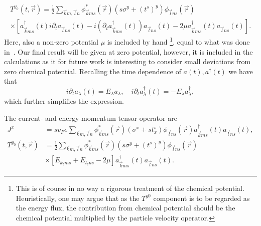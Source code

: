 \begin{multline}
    T^{y_0}(t, \vec{r}) =
    \frac{1}{2}
    \sum\limits_{\vec{k} m, \vec{l} n}^{}
    \phi ^{*}_{\vec{k} m s}(\vec{r}) (s \sigma^y + (t^s)^y) \phi _{\vec{l} n s }(\vec{r})\\
    \times \left[
      a^{\dagger}_{\vec{k} m s}(t) i \partial_t  a_{\vec{l} n s}(t)
      -
      i \left(\partial_t a^{\dagger}_{\vec{k} ms }(t) \right) a_{\vec{l} n s}(t)
      -  2\mu  a^{\dagger}_{\vec{k} m s}(t) a_{\vec{l} n s}(t)
        \right].
\end{multline}
Here, also a non-zero potential $\mu $ is included by hand%
\footnote{This is of course in no way a rigorous treatment of the chemical potential. Heuristically, one may argue that as the \( T^{y0} \) component is to be regarded as the energy flux, the contribution from chemical potential should be the chemical potential multiplied by the particle velocity operator. },%
equal to what was done in~\textcite{arjonaFingerprintsConformalAnomaly2019}.
Our final result will be given at zero potential, however, it is included in the calculations as it for future work is interesting to consider small deviations from zero chemical potential.
Recalling the time dependence of $a(t), a^{\dagger}(t)$ we have that
\[
  i \partial_t a_{\lambda }(t) = E_{\lambda }a_{\lambda },
  \quad
  i \partial_t a^{\dagger}_{\lambda }(t) = -E_{\lambda }a^{\dagger}_{\lambda },
\]
which further simplifies the expression.

\begin{summary}
  The current- and energy-momentum tensor operator are
  \begin{align}
    J^x &= sv_F e \sum\limits_{\vec{k}m, \vec{l}n}^{}
          \phi _{\vec{k}ms}^{*}(\vec{r}) \left(\sigma^x + s t^s_x\right) \phi _{\vec{l}ns}(\vec{r})
          a_{\vec{k}ms}^{\dagger}(t)
          a_{\vec{l}ns}(t),\\
    T^{y_0}(t, \vec{r}) &=
                          \frac{1}{2}
                          \sum\limits_{\vec{k} m, \vec{l} n}^{}
                          \phi ^{*}_{\vec{k} m s}(\vec{r}) (s \sigma^y + (t^s)^y) \phi _{\vec{l} n s }(\vec{r})\\
\nonumber        &\times \left[
                   E_{k_z m s} + E_{l_z n s} - 2\mu \right]
                   a^{\dagger}_{\vec{k} m s}(t)  a_{\vec{l} n s}(t).
  \end{align}
\end{summary}

